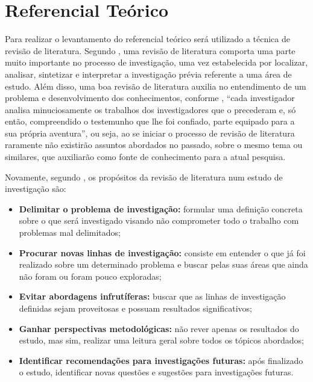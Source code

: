 \chapter{Referencial Teórico}

    Para realizar o levantamento do referencial teórico será utilizado a técnica de revisão de literatura.
    Segundo , uma revisão de literatura comporta uma parte muito importante no processo de investigação, 
    uma vez estabelecida por localizar, analisar, sintetizar e interpretar a investigação prévia referente a uma área de estudo. 
    Além disso, uma boa revisão de literatura auxilia no entendimento de um problema e desenvolvimento dos conhecimentos, 
    conforme , “cada investigador analisa minuciosamente os trabalhos dos investigadores 
    que o precederam e, só então, compreendido o testemunho que lhe foi confiado, parte equipado para a sua própria aventura”, 
    ou seja, ao se iniciar o processo de revisão de literatura raramente não existirão assuntos abordados no passado, sobre o 
    mesmo tema ou similares, que auxiliarão como fonte de conhecimento para a atual pesquisa.

    Novamente, segundo , os propósitos da revisão de literatura num estudo de investigação são:

    \begin{itemize}

        \item \textbf{Delimitar o problema de investigação:} formular uma definição concreta sobre o que será investigado visando não comprometer todo o trabalho com problemas mal delimitados;
        \item \textbf{Procurar novas linhas de investigação:} consiste em entender o que já foi realizado sobre um determinado problema e buscar pelas suas áreas que ainda não foram ou foram pouco exploradas;
        \item \textbf{Evitar abordagens infrutíferas:} buscar que as linhas de investigação definidas sejam proveitosas e possuam resultados significativos;
        \item \textbf{Ganhar perspectivas metodológicas:} não rever apenas os resultados do estudo, mas sim, realizar uma leitura geral sobre todos os tópicos abordados;
        \item \textbf{Identificar recomendações para investigações futuras:} após finalizado o estudo, identificar novas questões e sugestões para investigações futuras.

    \end{itemize}

